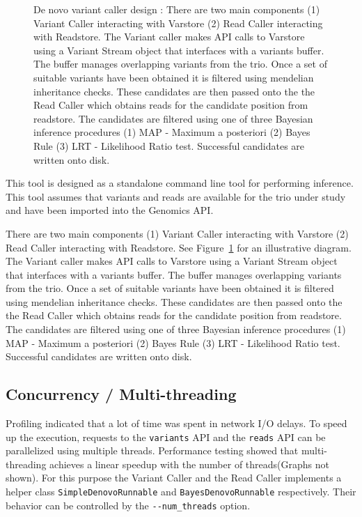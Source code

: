 \documentclass{article}
\begin{document}
\begin{figure}
\caption{ De novo variant caller design : There are two main components (1) Variant Caller interacting with Varstore (2) Read Caller interacting with Readstore. The Variant caller makes API calls to Varstore using a Variant Stream object that interfaces with a variants buffer. The buffer manages overlapping variants from the trio. Once a set of suitable variants have been obtained it is filtered using mendelian inheritance checks. These candidates are then passed onto the the Read Caller which obtains reads for the candidate position from readstore. The candidates are filtered using one of three Bayesian inference procedures (1) MAP - Maximum a posteriori (2) Bayes Rule (3) LRT - Likelihood Ratio test. Successful candidates are written onto disk.}
\label{fig:design}
\end{figure}

This tool is designed as a standalone command line tool for performing inference. This tool assumes that variants and reads are available for the trio under study and have been imported into the Genomics API. 

\vspace{1em}
There are two main components (1) Variant Caller interacting with Varstore (2) Read Caller interacting with Readstore. See Figure~\ref{fig:design} for an illustrative diagram. The Variant caller makes API calls to Varstore using a Variant Stream object that interfaces with a variants buffer. The buffer manages overlapping variants from the trio. Once a set of suitable variants have been obtained it is filtered using mendelian inheritance checks. These candidates are then passed onto the the Read Caller which obtains reads for the candidate position from readstore. The candidates are filtered using one of three Bayesian inference procedures (1) MAP - Maximum a posteriori (2) Bayes Rule (3) LRT - Likelihood Ratio test. Successful candidates are written onto disk.

\subsection{Concurrency / Multi-threading}
Profiling indicated that a lot of time was spent in network I/O delays. To speed up the execution, requests to the \verb|variants| API and the \verb|reads| API can be parallelized using multiple threads. Performance testing showed that multi-threading achieves a linear speedup with the number of threads(Graphs not shown). For this purpose the Variant Caller and the Read Caller implements a helper class \verb|SimpleDenovoRunnable| and \verb|BayesDenovoRunnable| respectively. Their behavior can be controlled by the \verb|--num_threads| option.
\end{document}

